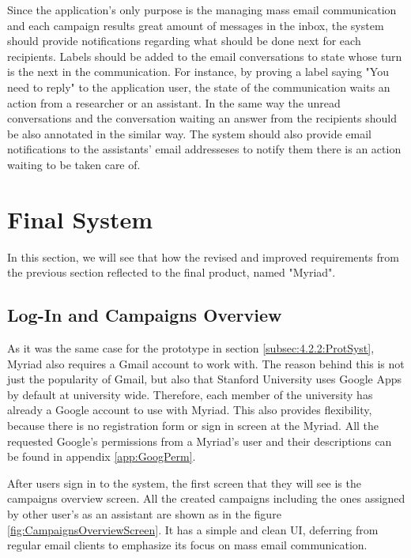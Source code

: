 Since the application's only purpose is the managing mass email communication and each campaign results great amount of messages in the inbox, the system should provide notifications regarding what should be done next for each recipients. Labels should be added to the email conversations to state whose turn is the next in the communication. For instance, by proving a label saying "You need to reply" to the application user, the state of the communication waits an action from a researcher or an assistant. In the same way the unread conversations and the conversation waiting an answer from the recipients should be also annotated in the similar way. The system should also provide email notifications to the assistants' email addresseses to notify them there is an action waiting to be taken care of.

\section{Final System}
\label{sec:5.2:FinaSyst}
In this section, we will see that how the revised and improved requirements from the previous section reflected to the final product, named "Myriad".

\subsection{Log-In and Campaigns Overview}
\label{subsec:5.2.1:CampOver}

As it was the same case for the prototype in section \ref{subsec:4.2.2:ProtSyst}, Myriad also requires a Gmail account to work with. The reason behind this is not just the popularity of Gmail, but also that Stanford University uses Google Apps by default at university wide. Therefore, each member of the university has already a Google account to use with Myriad. This also provides flexibility, because there is no registration form or sign in screen at the Myriad. All the requested Google's permissions from a Myriad's user and their descriptions can be found in appendix \ref{app:GoogPerm}.
\vspace{1cm}

After users sign in to the system, the first screen that they will see is the campaigns overview screen. All the created campaigns including the ones assigned by other user's as an assistant are shown as in the figure \ref{fig:CampaignsOverviewScreen}. It has a simple and clean \ac{UI}, deferring from regular email clients to emphasize its focus on mass email communication.

